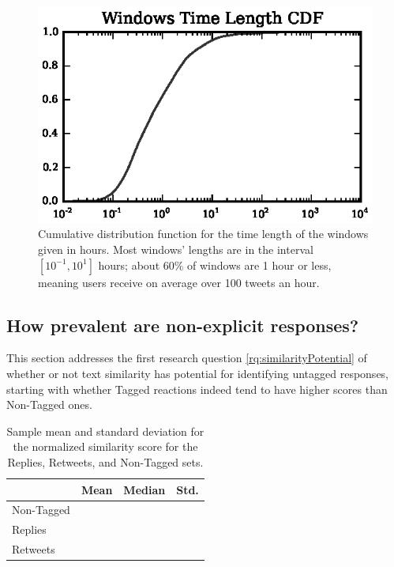 \begin{figure}[!htbp]
\centering
\includegraphics[scale=1]{./figures/window_time_size_histogram.eps}
\caption{Cumulative distribution function for the time length of the windows given in hours. Most windows' lengths are in the interval $[10^{-1}, 10^1]$ hours; about 60\% of windows are 1 hour or less, meaning users receive on average over 100 tweets an hour.}
\label{fig:window_time_size_histogram}
\end{figure}

\subsection{How prevalent are non-explicit responses?}

This section addresses the first research question \ref{rq:similarityPotential} of whether or not text similarity has potential for identifying untagged responses, starting with whether Tagged reactions indeed tend to have higher scores than Non-Tagged ones. 

\begin{table}[!tb]
	\centering
	\fontsize{9pt}{10pt}\selectfont
		\begin{tabular}{l|c|c|c|}
			\cline{2-4}
												& Mean					& Median					& Std. \\ \hline 
			\multicolumn{1}{|l|}{Non-Tagged}	& \nonTaggedScoreMean{}	&	\nonTaggedScoreMedian{}	& \nonTaggedScoreStd{} \\ \hline
			\multicolumn{1}{|l|}{Replies}		& \repliesScoreMean{}	&	\repliesScoreMedian{}	& \repliesScoreStd{} \\ \hline
			\multicolumn{1}{|l|}{Retweets}		& \retweetsScoreMean{}	&	\retweetsScoreMedian{}	& \retweetsScoreStd{} \\ \hline
		\end{tabular}
\caption{Sample mean and standard deviation for the normalized similarity score for the Replies, Retweets, and Non-Tagged sets.}
	\label{tab:sampleDistributionsStatistics}
\end{table}


